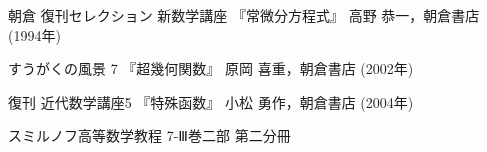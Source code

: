 \documentclass[a4paper,draft]{ltjsbook}
\begin{document}
\begin{thebibliography}{9}
     朝倉 復刊セレクション 新数学講座 『常微分方程式』 高野 恭一，朝倉書店 (1994年)

     すうがくの風景 7 『超幾何関数』 原岡 喜重，朝倉書店 (2002年)

     復刊 近代数学講座5 『特殊函数』 小松 勇作，朝倉書店 (2004年)




     スミルノフ高等数学教程 7-Ⅲ巻二部 第二分冊


\end{thebibliography}
\end{document}
